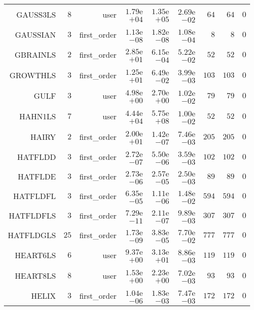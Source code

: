 \begin{longtable}{rrrrrrrrr}
GAUSS3LS & \(     8\) & user & \( 1.79\)e\(+04\) & \( 1.35\)e\(+05\) & \( 2.69\)e\(-02\) & \(    64\) & \(    64\) & \(     0\) \\
GAUSSIAN & \(     3\) & first\_order & \( 1.13\)e\(-08\) & \( 1.82\)e\(-08\) & \( 1.08\)e\(-04\) & \(     8\) & \(     8\) & \(     0\) \\
GBRAINLS & \(     2\) & first\_order & \( 2.85\)e\(+01\) & \( 6.15\)e\(-04\) & \( 5.22\)e\(-02\) & \(    52\) & \(    52\) & \(     0\) \\
GROWTHLS & \(     3\) & first\_order & \( 1.25\)e\(+01\) & \( 6.49\)e\(-02\) & \( 3.99\)e\(-03\) & \(   103\) & \(   103\) & \(     0\) \\
GULF & \(     3\) & user & \( 4.98\)e\(+00\) & \( 2.70\)e\(+00\) & \( 1.02\)e\(-02\) & \(    79\) & \(    79\) & \(     0\) \\
HAHN1LS & \(     7\) & user & \( 4.44\)e\(+04\) & \( 5.75\)e\(+08\) & \( 1.00\)e\(-02\) & \(    52\) & \(    52\) & \(     0\) \\
HAIRY & \(     2\) & first\_order & \( 2.00\)e\(+01\) & \( 1.42\)e\(-07\) & \( 7.46\)e\(-03\) & \(   205\) & \(   205\) & \(     0\) \\
HATFLDD & \(     3\) & first\_order & \( 2.72\)e\(-07\) & \( 5.50\)e\(-06\) & \( 3.59\)e\(-03\) & \(   102\) & \(   102\) & \(     0\) \\
HATFLDE & \(     3\) & first\_order & \( 2.73\)e\(-06\) & \( 2.57\)e\(-05\) & \( 2.50\)e\(-03\) & \(    89\) & \(    89\) & \(     0\) \\
HATFLDFL & \(     3\) & first\_order & \( 6.35\)e\(-05\) & \( 1.11\)e\(-06\) & \( 1.48\)e\(-02\) & \(   594\) & \(   594\) & \(     0\) \\
HATFLDFLS & \(     3\) & first\_order & \( 7.29\)e\(-11\) & \( 2.11\)e\(-07\) & \( 9.89\)e\(-03\) & \(   307\) & \(   307\) & \(     0\) \\
HATFLDGLS & \(    25\) & first\_order & \( 1.73\)e\(-09\) & \( 3.83\)e\(-05\) & \( 7.70\)e\(-02\) & \(   777\) & \(   777\) & \(     0\) \\
HEART6LS & \(     6\) & user & \( 9.37\)e\(+00\) & \( 3.13\)e\(+01\) & \( 8.86\)e\(-03\) & \(   119\) & \(   119\) & \(     0\) \\
HEART8LS & \(     8\) & user & \( 1.53\)e\(+00\) & \( 2.23\)e\(+00\) & \( 7.02\)e\(-03\) & \(    93\) & \(    93\) & \(     0\) \\
HELIX & \(     3\) & first\_order & \( 1.04\)e\(-06\) & \( 1.83\)e\(-03\) & \( 7.47\)e\(-03\) & \(   172\) & \(   172\) & \(     0\) \\

\end{longtable}
